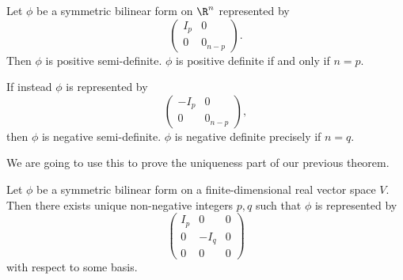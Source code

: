 \documentclass[a4paper]{article}
\begin{document}
\begin{eg}
  Let $\phi$ be a symmetric bilinear form on $\R^n$ represented by
  \[
    \begin{pmatrix}
      I_p & 0\\
      0 & 0_{n - p}
    \end{pmatrix}.
  \]
  Then $\phi$ is positive semi-definite. $\phi$ is positive definite if and only if $n = p$.

  If instead $\phi$ is represented by
  \[
    \begin{pmatrix}
      -I_p & 0\\
      0 & 0_{n - p}
    \end{pmatrix},
  \]
  then $\phi$ is negative semi-definite. $\phi$ is negative definite precisely if $n = q$.
\end{eg}

We are going to use this to prove the uniqueness part of our previous theorem.
\begin{thm}
  Let $\phi$ be a symmetric bilinear form on a finite-dimensional real vector space $V$. Then there exists unique non-negative integers $p, q$ such that $\phi$ is represented by
  \[
    \begin{pmatrix}
      I_p & 0 & 0\\
      0 & -I_q & 0\\
      0 & 0 & 0
    \end{pmatrix}
  \]
  with respect to some basis.
\end{thm}
\end{document}
